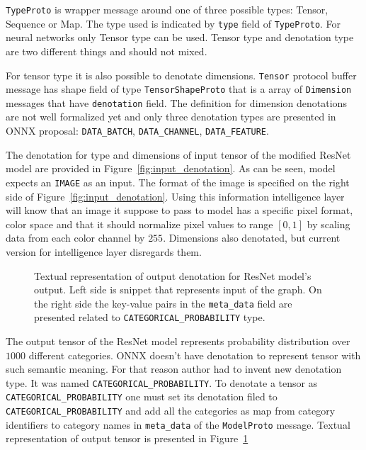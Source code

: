 \documentclass[english, 12pt, a4paper, elec, utf8, online]{aaltothesis}
\begin{document}
\texttt{TypeProto} is wrapper message around one of three possible types: Tensor, Sequence or Map. The type used is indicated by \texttt{type} field of \texttt{TypeProto}. For neural networks only Tensor type can be used. Tensor type and denotation type are two different things and should not mixed.     

For tensor type it is also possible to denotate dimensions. \texttt{Tensor} protocol buffer message has shape field of type \texttt{TensorShapeProto} that is a array of \texttt{Dimension} messages that have \texttt{denotation} field. The definition for dimension denotations are not well formalized yet and only three denotation types are presented in ONNX proposal: \texttt{DATA\_BATCH}, \texttt{DATA\_CHANNEL}, \texttt{DATA\_FEATURE}.  


The denotation for type and dimensions of input tensor of the modified ResNet model are provided in Figure~\ref{fig:input_denotation}. As can be seen, model expects an \texttt{IMAGE} as an input. The format of the image is specified on the right side of Figure~\ref{fig:input_denotation}. Using this information intelligence layer will know that an image it suppose to pass to model has a specific pixel format, color space and that it should normalize pixel values to range $[0, 1]$ by scaling data from each color channel by $255$. Dimensions also denotated, but current version for intelligence layer disregards them.    

\begin{figure}[h!]
\centering
{}

\caption{Textual representation of output denotation for ResNet model's output. Left side is snippet that represents input of the graph. On the right side the key-value pairs in the \texttt{meta\_data} field are presented related to \texttt{CATEGORICAL\_PROBABILITY} type.}\label{fig:output_denotation}
\end{figure}

The output tensor of the ResNet model represents probability distribution over $1000$ different categories. ONNX doesn't have denotation to represent tensor with such semantic meaning. For that reason author had to invent new denotation type. It was named  \texttt{CATEGORICAL\_PROBABILITY}. To denotate a tensor as \texttt{CATEGORICAL\_PROBABILITY} one must set its denotation filed to \texttt{CATEGORICAL\_PROBABILITY} and add all the categories as map from category identifiers to category names in \texttt{meta\_data} of the \texttt{ModelProto} message. Textual representation of output tensor is presented in Figure~\ref{fig:output_denotation}        
\end{document}
